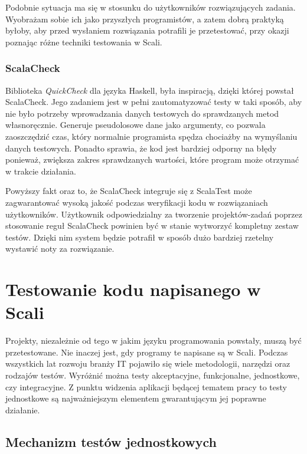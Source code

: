 \documentclass[wimgr]{xmgr}
\begin{document}
Podobnie sytuacja ma się w stosunku do użytkowników rozwiązujących zadania. Wyobrażam sobie ich jako przyszłych programistów, a zatem dobrą praktyką byłoby, aby przed wysłaniem rozwiązania potrafili je przetestować, przy okazji poznając różne techniki testowania w Scali. 

\subsection{ScalaCheck}

\label{scalaCheckSrodek}

Biblioteka \emph{QuickCheck} dla języka Haskell, była inspiracją, dzięki której powstał ScalaCheck. Jego zadaniem jest w pełni zautomatyzować testy w taki sposób, aby nie było potrzeby wprowadzania danych testowych do sprawdzanych metod własnoręcznie. Generuje pseudolosowe dane jako argumenty, co pozwala zaoszczędzić czas, który normalnie programista spędza chociażby na wymyślaniu danych testowych. Ponadto sprawia, że kod jest bardziej odporny na błędy ponieważ, zwiększa zakres sprawdzanych wartości, które program może otrzymać w trakcie działania.

Powyższy fakt oraz to, że ScalaCheck integruje się z ScalaTest może zagwarantować wysoką jakość podczas weryfikacji kodu w rozwiązaniach użytkowników. Użytkownik odpowiedzialny za tworzenie projektów-zadań poprzez stosowanie reguł ScalaCheck powinien być w stanie wytworzyć kompletny zestaw testów. Dzięki nim system będzie potrafił w sposób dużo bardziej rzetelny wystawić noty za rozwiązanie.
      
\chapter{Testowanie kodu napisanego w Scali}      

Projekty, niezależnie od tego w jakim języku programowania powstały, muszą być przetestowane. Nie inaczej jest, gdy programy te napisane są w Scali. Podczas wszystkich lat rozwoju branży IT pojawiło się wiele metodologii, narzędzi oraz rodzajów testów. Wyróżnić można testy akceptacyjne, funkcjonalne, jednostkowe, czy integracyjne. Z punktu widzenia aplikacji będącej tematem pracy to testy jednostkowe są najważniejszym elementem gwarantującym jej poprawne działanie.       
      
\section{Mechanizm testów jednostkowych}
\end{document}
